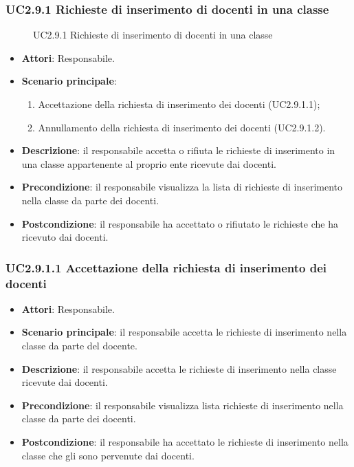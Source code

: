 \subsubsection{UC2.9.1 Richieste di inserimento di docenti in una classe}
\begin{figure}[H]
\centering
\noindent{}
\caption{UC2.9.1 Richieste di inserimento di docenti in una classe}
\end{figure}
\begin{itemize}
\item \textbf{Attori}: Responsabile.
\item \textbf{Scenario principale}:
\begin{enumerate}
\item Accettazione della richiesta di inserimento dei docenti (UC2.9.1.1);
\item Annullamento della richiesta di inserimento dei docenti (UC2.9.1.2).
\end{enumerate}
\item \textbf{Descrizione}: il responsabile accetta o rifiuta le richieste di inserimento in una classe appartenente al proprio ente ricevute dai docenti.
\item \textbf{Precondizione}: il responsabile visualizza la lista di richieste di inserimento nella classe da parte dei docenti.
\item \textbf{Postcondizione}: il responsabile ha accettato o rifiutato le richieste che ha ricevuto dai docenti.
\end{itemize}
\subsubsection{UC2.9.1.1 Accettazione della richiesta di inserimento dei docenti}
\begin{itemize}
\item \textbf{Attori}: Responsabile.
\item \textbf{Scenario principale}: il responsabile accetta le richieste di inserimento nella classe da parte del docente.
\item \textbf{Descrizione}: il responsabile accetta le richieste di inserimento nella classe ricevute dai docenti.
\item \textbf{Precondizione}: il responsabile visualizza lista richieste di inserimento nella classe da parte dei docenti.
\item \textbf{Postcondizione}: il responsabile ha accettato le richieste di inserimento nella classe che gli sono pervenute dai docenti.
\end{itemize}
